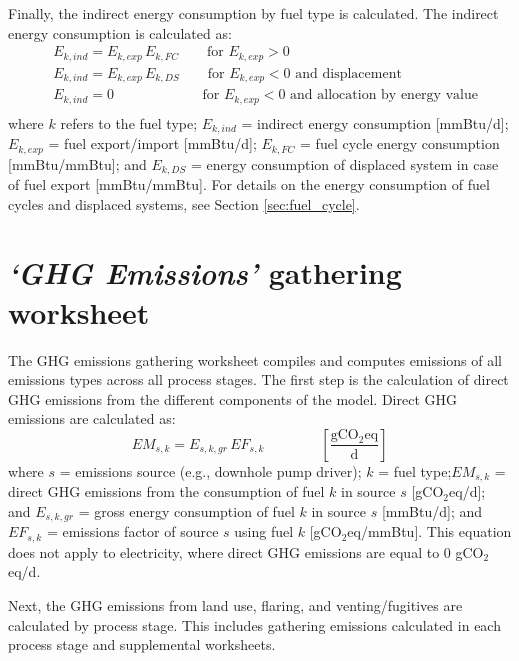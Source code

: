 \documentclass[11pt]{report}
\newcommand{\sheet}[1]{\textit{`{#1}'}}
\newcommand{\eqnunitfrac}[2]{\quad\quad \scriptstyle{\left[\frac{\text{#1}}{\text{#2}}\right]}}
\begin{document}
Finally, the indirect energy consumption by fuel type is calculated. The indirect energy consumption is calculated as:
\begin{equation}
\begin{split}
& E_{k,ind} = E_{k,exp} \, E_{k,FC} \quad\quad \text{for}\,\, E_{k,exp} > 0\\
& E_{k,ind} = E_{k,exp} \, E_{k,DS} \quad\quad \text{for}\,\, E_{k,exp} < 0 \,\,\text{and displacement}\\ 
& E_{k,ind} = 0 \quad\quad\quad\quad\quad\quad\,\, \text{for}\,\, E_{k,exp} < 0 \,\,\text{and allocation by energy value}\\
\end{split}
\end{equation}
where $k$ refers to the fuel type; $E_{k,ind}$ = indirect energy consumption [mmBtu/d]; $E_{k,exp}$ = fuel export/import [mmBtu/d]; $E_{k,FC}$ = fuel cycle energy consumption [mmBtu/mmBtu]; and $E_{k,DS}$ = energy consumption of displaced system in case of fuel export [mmBtu/mmBtu]. For details on the energy consumption of fuel cycles and displaced systems, see Section \ref{sec:fuel_cycle}.


\clearpage

\section{\sheet{GHG Emissions} gathering worksheet}\label{sec:GHG_emissions}

The GHG emissions gathering worksheet compiles and computes emissions of all emissions types across all process stages. The first step is the calculation of direct GHG emissions from the different components of the model. Direct GHG emissions are calculated as: 
\begin{equation}
EM_{s,k} = E_{s,k,gr} \, EF_{s,k} \quad\quad\eqnunitfrac{gCO$_{2}$eq}{d}
\label{direct_emissions}
\end{equation}
where $s$ = emissions source (e.g., downhole pump driver); $k$ = fuel type;\newline $EM_{s,k}$ = direct GHG emissions from the consumption of fuel $k$ in source $s$ [gCO$_{2}$eq/d]; and $E_{s,k,gr}$ = gross energy consumption of fuel $k$ in source $s$ [mmBtu/d]; and $EF_{s,k}$ = emissions factor of source $s$ using fuel $k$ [gCO$_2$eq/mmBtu]. This equation does not apply to electricity, where direct GHG emissions are equal to 0 gCO$_{2}$eq/d.

Next, the GHG emissions from land use, flaring, and venting/fugitives are calculated by process stage. This includes gathering emissions calculated in each process stage and supplemental worksheets.
\end{document}
